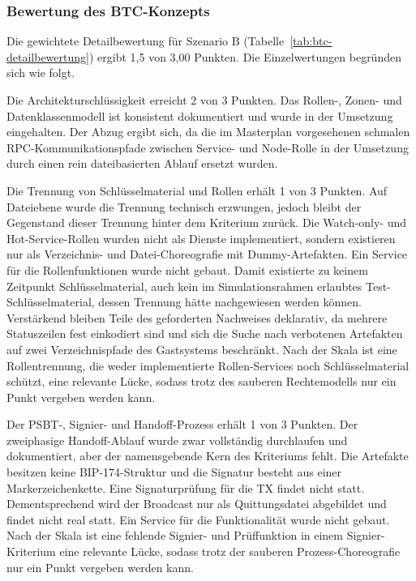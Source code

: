 {\subsubsection{Bewertung des \ac{BTC}-Konzepts}

Die gewichtete Detailbewertung für Szenario B (Tabelle~\ref{tab:btc-detailbewertung}) ergibt 1{,}5 von 3{,}00 Punkten. Die Einzelwertungen begründen sich wie folgt.

Die Architekturschlüssigkeit erreicht 2 von 3 Punkten. Das Rollen-, Zonen- und Datenklassenmodell ist konsistent dokumentiert und wurde in der Umsetzung eingehalten. 
Der Abzug ergibt sich, da die im Masterplan vorgesehenen schmalen \ac{RPC}-Kommunikationspfade zwischen Service- und Node-Rolle in der Umsetzung durch einen rein dateibasierten Ablauf ersetzt wurden.


Die Trennung von Schlüsselmaterial und Rollen erhält 1 von 3 Punkten. Auf Dateiebene wurde die Trennung technisch erzwungen, jedoch bleibt der Gegenstand dieser Trennung hinter dem Kriterium zurück. Die Watch-only- und Hot-Service-Rollen wurden nicht als Dienste implementiert, sondern existieren nur als Verzeichnis- und Datei-Choreografie mit Dummy-Artefakten. Ein Service für die Rollenfunktionen wurde nicht gebaut. Damit existierte zu keinem
Zeitpunkt Schlüsselmaterial, auch kein im Simulationsrahmen erlaubtes Test-Schlüsselmaterial, dessen Trennung hätte nachgewiesen werden können.
Verstärkend bleiben Teile des geforderten Nachweises deklarativ, da mehrere Statuszeilen fest einkodiert sind und sich die Suche nach verbotenen Artefakten auf zwei Verzeichnispfade des Gastsystems beschränkt. 
Nach der Skala ist eine Rollentrennung, die weder implementierte Rollen-Services noch
Schlüsselmaterial schützt, eine relevante Lücke, sodass trotz des sauberen Rechtemodells nur ein Punkt vergeben werden kann.

Der \ac{PSBT}-, Signier- und Handoff-Prozess erhält 1 von 3 Punkten. 
Der zweiphasige Handoff-Ablauf wurde zwar vollständig durchlaufen und dokumentiert, aber der namensgebende Kern des Kriteriums fehlt.
Die Artefakte besitzen keine BIP-174-Struktur und die Signatur besteht aus einer Markerzeichenkette. Eine Signaturprüfung für die \ac{TX} findet nicht statt.
Dementsprechend wird der Broadcast nur als Quittungsdatei abgebildet und findet nicht real statt.
Ein Service für die Funktionalität wurde nicht gebaut.
Nach der Skala ist eine fehlende Signier- und Prüffunktion in einem Signier-Kriterium eine relevante Lücke, sodass trotz der sauberen Prozess-Choreografie nur ein Punkt vergeben werden kann.

}

